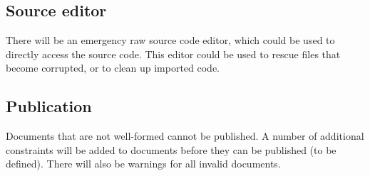 \subsection{Source editor}
There will be an emergency raw source code editor, which could be used to directly access the source code. This editor could be used to rescue files that become corrupted, or to clean up imported code.
\subsection{Publication}
Documents that are not well-formed cannot be published. A number of additional constraints will be added to documents before they can be published (to be defined). There will also be warnings for all invalid documents.

